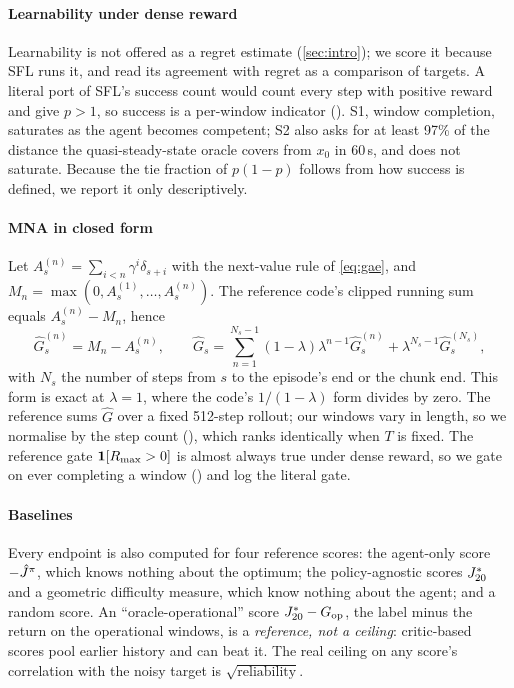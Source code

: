 \paragraph{Learnability under dense reward} Learnability is not offered as a regret
estimate (\cref{sec:intro}); we score it because SFL runs it, and read its agreement with
regret as a comparison of targets. A literal port of SFL's success count would
count every step with positive reward and give $p > 1$, so success is a per-window
indicator (). S1, window completion, saturates as the agent becomes competent;
S2 also asks for at least 97\% of the distance the quasi-steady-state oracle covers from
$x_0$ in 60\,s, and does not saturate. Because the tie fraction of $p(1-p)$ follows from
how success is defined, we report it only descriptively.

\paragraph{MNA in closed form} Let $A^{(n)}_s = \sum_{i<n}\gamma^i\delta_{s+i}$ with the
next-value rule of \cref{eq:gae}, and $M_n = \max(0, A^{(1)}_s, \dots, A^{(n)}_s)$. The
reference code's clipped running sum equals $A^{(n)}_s - M_n$, hence
\begin{equation}
  \hat G^{(n)}_s = M_n - A^{(n)}_s, \qquad
  \hat G_s = \sum_{n=1}^{N_s-1}(1-\lambda)\lambda^{n-1}\hat G^{(n)}_s
            + \lambda^{N_s-1}\hat G^{(N_s)}_s,
\end{equation}
with $N_s$ the number of steps from $s$ to the episode's end or the chunk end. This form
is exact at $\lambda = 1$, where the code's $1/(1-\lambda)$ form divides by zero.
The reference sums $\hat G$ over a fixed 512-step rollout; our windows vary in length, so we
normalise by the step count (), which ranks identically when $T$ is fixed. The
reference gate $\mathbf{1}[R_{\max} > 0]$ is almost always true under dense reward, so we gate
on ever completing a window () and log the literal gate.

\paragraph{Baselines} Every endpoint is also computed for four reference scores: the
agent-only score $-\hat{J}^{\pi}$, which knows nothing about the optimum; the policy-agnostic
scores $J^{*}_{20}$ and a geometric difficulty measure, which know nothing about the agent;
and a random score. An ``oracle-operational'' score $J^{*}_{20} - G_{\text{op}}$, the label
minus the return on the operational windows, is a \emph{reference, not a ceiling}:
critic-based scores pool earlier history and can beat it. The real ceiling on any score's
correlation with the noisy target is $\sqrt{\text{reliability}}$.

